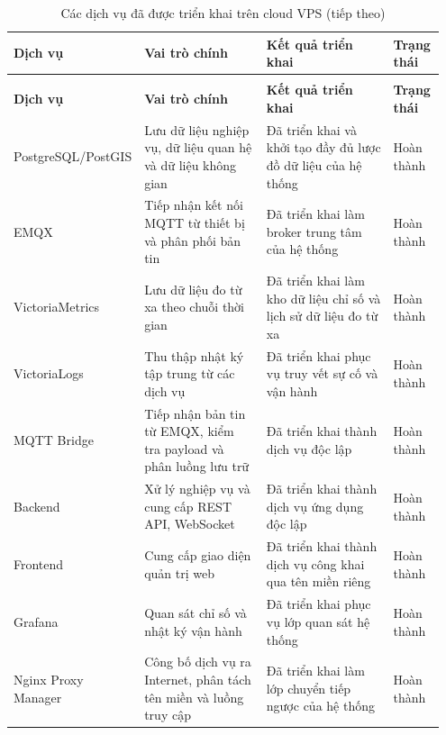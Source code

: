 \documentclass[a4paper]{extarticle}
\newcommand{\thesissettableid}[2]{%
  \renewcommand{\thetable}{#1}%
  \renewcommand{\theHtable}{#2}%
}
\begin{document}
{\thesissettableid{4.7}{condensed-bang-4-7-cac-dich-vu-da-duoc-trien-khai-tren-cloud-vps}
\def\LTcaptype{table}
\begin{longtable}{|L{0.210\linewidth}|L{0.300\linewidth}|L{0.320\linewidth}|L{0.120\linewidth}|}
\caption{Các dịch vụ đã được triển khai trên cloud VPS}\label{tab:condensed-bang-4-7-cac-dich-vu-da-duoc-trien-khai-tren-cloud-vps}\\
\hline
\textbf{Dịch vụ} & \textbf{Vai trò chính} & \textbf{Kết quả triển khai} & \textbf{Trạng thái} \\
\hline
\endfirsthead
\caption[]{Các dịch vụ đã được triển khai trên cloud VPS (tiếp theo)}\\
\hline
\textbf{Dịch vụ} & \textbf{Vai trò chính} & \textbf{Kết quả triển khai} & \textbf{Trạng thái} \\
\hline
\endhead
\endfoot
\endlastfoot
PostgreSQL/\newline PostGIS & Lưu dữ liệu nghiệp vụ, dữ liệu quan hệ và dữ liệu không gian & Đã triển khai và khởi tạo đầy đủ lược đồ dữ liệu của hệ thống & Hoàn thành \\\hline
EMQX & Tiếp nhận kết nối MQTT từ thiết bị và phân phối bản tin & Đã triển khai làm broker trung tâm của hệ thống & Hoàn thành \\\hline
VictoriaMetrics & Lưu dữ liệu đo từ xa theo chuỗi thời gian & Đã triển khai làm kho dữ liệu chỉ số và lịch sử dữ liệu đo từ xa & Hoàn thành \\\hline
VictoriaLogs & Thu thập nhật ký tập trung từ các dịch vụ & Đã triển khai phục vụ truy vết sự cố và vận hành & Hoàn thành \\\hline
MQTT Bridge & Tiếp nhận bản tin từ EMQX, kiểm tra payload và phân luồng lưu trữ & Đã triển khai thành dịch vụ độc lập & Hoàn thành \\\hline
Backend & Xử lý nghiệp vụ và cung cấp REST API, WebSocket & Đã triển khai thành dịch vụ ứng dụng độc lập & Hoàn thành \\\hline
Frontend & Cung cấp giao diện quản trị web & Đã triển khai thành dịch vụ công khai qua tên miền riêng & Hoàn thành \\\hline
Grafana & Quan sát chỉ số và nhật ký vận hành & Đã triển khai phục vụ lớp quan sát hệ thống & Hoàn thành \\\hline
Nginx Proxy Manager & Công bố dịch vụ ra Internet, phân tách tên miền và luồng truy cập & Đã triển khai làm lớp chuyển tiếp ngược của hệ thống & Hoàn thành \\\hline
\end{longtable}
}
\end{document}
